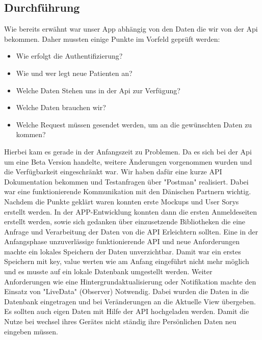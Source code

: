 \subsection{Durchführung}
Wie bereits erwähnt war unser App abhängig von den Daten die wir von der Api bekommen. Daher mussten einige Punkte im Vorfeld geprüft werden:
\begin{itemize}
	\item Wie erfolgt die Authentifizierung?
	\item Wie und wer legt neue Patienten an?
	\item Welche Daten Stehen uns in der Api zur Verfügung?
	\item Welche Daten brauchen wir?
	\item Welche Request müssen gesendet werden, um an die gewünschten Daten zu kommen?
\end{itemize}
Hierbei kam es gerade in der Anfangszeit zu Problemen. Da es sich bei der Api um eine Beta Version handelte, weitere Änderungen vorgenommen wurden und die Verfügbarkeit eingeschränkt war.
Wir haben dafür eine kurze API Dokumentation bekommen und Testanfragen über "Postman" realisiert. Dabei war eine funktionierende Kommunikation mit den Dänischen Partnern wichtig.  
Nachdem die Punkte geklärt waren konnten erste Mockups und User Sorys erstellt werden. In der APP-Entwicklung konnten dann die ersten Anmeldeseiten erstellt werden, sowie sich gedanken   über einzusetzende Bibliotheken die eine Anfrage und Verarbeitung der Daten von die API Erleichtern sollten.
Eine in der Anfangsphase unzuverlässige funktionierende API und neue Anforderungen machte ein lokales Speichern der Daten unverzichtbar. 
Damit war ein erstes Speichern mit key, value werten wie am Anfang eingeführt nicht mehr möglich und es musste auf ein lokale Datenbank umgestellt werden. Weiter Anforderungen wie eine Hintergrundaktualisierung oder Notifikation machte den Einsatz von "LiveData"  (Observer) Notwendig. Dabei wurden die Daten in die Datenbank eingetragen und bei Veränderungen an die Aktuelle View übergeben. Es sollten auch eigen Daten mit Hilfe der API hochgeladen werden. Damit die Nutze bei wechsel ihres Gerätes nicht ständig ihre Persönlichen Daten neu eingeben müssen.
